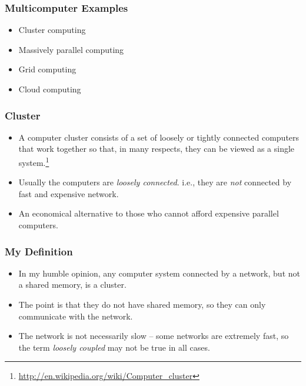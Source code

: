 \documentclass{beamer}
\begin{document}
\begin{CJK}{UTF8}{bsmi}
\begin{frame}
\frametitle{Multicomputer Examples} 
\begin{itemize}
\item Cluster computing
\item Massively parallel computing
\item Grid computing
\item Cloud computing
\end{itemize}
\end{frame}



\begin{frame}
\frametitle{Cluster}
\begin{itemize}
\item A computer cluster consists of a set of loosely or tightly
  connected computers that work together so that, in many respects,
  they can be viewed as a single
  system.\footnote{\url{http://en.wikipedia.org/wiki/Computer_cluster}}
\item Usually the computers are {\em loosely connected}. i.e., they
  are {\em not} connected by fast and expensive network.
\item An economical alternative to those who cannot afford expensive
  parallel computers.
\end{itemize}
\end{frame}

\begin{frame}
\frametitle{My Definition}
\begin{itemize}
\item In my humble opinion, any computer system connected by a network, but not a shared memory, is a cluster.
\item The point is that they do not have shared memory, so they can only communicate with the network.
\item The network is not necessarily slow -- some networks are extremely fast, so the term {\em loosely coupled} may not be true in all cases.
\end{itemize}
\end{frame}


\end{CJK}
\end{document}
